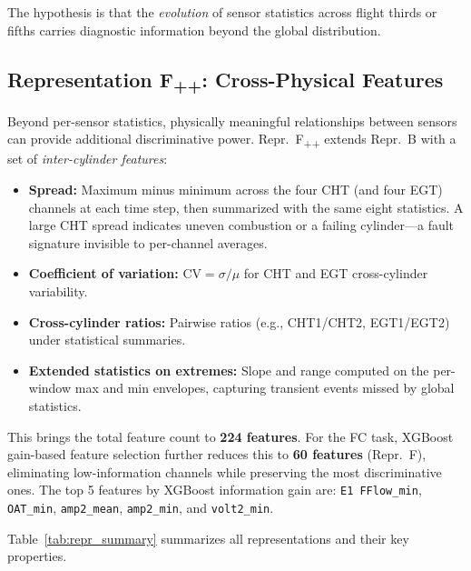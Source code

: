 The hypothesis is that the \textit{evolution} of sensor statistics across
flight thirds or fifths carries diagnostic information beyond the global
distribution.

\subsection{Representation F\textsubscript{++}: Cross-Physical Features}
\label{subsec:reprFpp}

Beyond per-sensor statistics, physically meaningful relationships between
sensors can provide additional discriminative power. Repr.~F\textsubscript{++}
extends Repr.~B with a set of \textit{inter-cylinder features}:

\begin{itemize}
    \item \textbf{Spread:} Maximum minus minimum across the four CHT (and four
          EGT) channels at each time step, then summarized with the same eight
          statistics. A large CHT spread indicates uneven combustion or a
          failing cylinder---a fault signature invisible to per-channel averages.
    \item \textbf{Coefficient of variation:} $\text{CV} = \sigma / \mu$ for
          CHT and EGT cross-cylinder variability.
    \item \textbf{Cross-cylinder ratios:} Pairwise ratios (e.g.,
          CHT1/CHT2, EGT1/EGT2) under statistical summaries.
    \item \textbf{Extended statistics on extremes:} Slope and range computed on
          the per-window max and min envelopes, capturing transient events missed
          by global statistics.
\end{itemize}

This brings the total feature count to \textbf{224 features}. For the FC task,
XGBoost gain-based feature selection further reduces this to \textbf{60 features}
(Repr.~F), eliminating low-information channels while preserving the most
discriminative ones. The top 5 features by XGBoost information gain are:
\texttt{E1 FFlow\_min}, \texttt{OAT\_min}, \texttt{amp2\_mean},
\texttt{amp2\_min}, and \texttt{volt2\_min}.

Table~\ref{tab:repr_summary} summarizes all representations and their key
properties.

